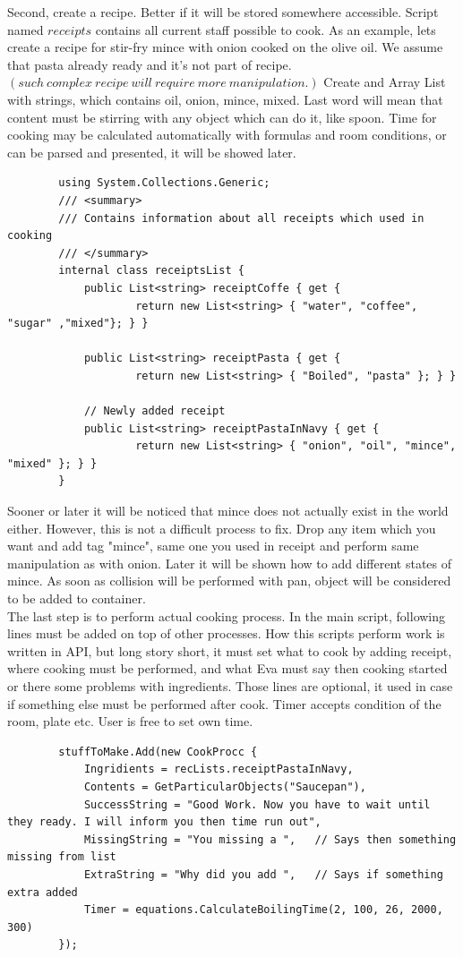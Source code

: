 \documentclass[18pt]{article}
\numberwithin{equation}{section} %
\numberwithin{figure}{section} %
\numberwithin{table}{section} %
\begin{document}
		Second, create a recipe. Better if it will be stored somewhere accessible. Script named $receipts$ contains all current staff possible to cook. As an example, lets create a recipe for stir-fry mince with onion cooked on the olive oil. We assume that pasta already ready and it's not part of recipe. $ \left(such\ complex\ recipe\ will\ require\ more\ manipulation.  \right) $ Create and Array List with strings, which contains oil, onion, mince, mixed. Last word will mean that content must be stirring with any object which can do it, like spoon. Time for cooking may be calculated automatically with formulas and room conditions, or can be parsed and presented, it will be showed later.
		
		\lstset{style=sharpc}
		\begin{lstlisting}
		using System.Collections.Generic;
		/// <summary>
		/// Contains information about all receipts which used in cooking
		/// </summary>
		internal class receiptsList {    
			public List<string> receiptCoffe { get { 
					return new List<string> { "water", "coffee", "sugar" ,"mixed"}; } }
					
			public List<string> receiptPasta { get { 
					return new List<string> { "Boiled", "pasta" }; } }
			
			// Newly added receipt		
			public List<string> receiptPastaInNavy { get { 
					return new List<string> { "onion", "oil", "mince", "mixed" }; } }
		}
		\end{lstlisting}
		
		Sooner or later it will be noticed that mince does not actually exist in the world either. However, this is not a difficult process to fix. Drop any item which you want and add tag "mince", same one you used in receipt and perform same manipulation as with onion. Later it will be shown how to add different states of mince. As soon as collision will be performed with pan, object will be considered to be added to container. \\
		
		The last step is to perform actual cooking process. In the main script, following lines must be added on top of other processes. How this scripts perform work is written in API, but long story short, it must set what to cook by adding receipt, where cooking must be performed, and what Eva must say then cooking started or there some problems with ingredients. Those lines are optional, it used in case if something else must be performed after cook. Timer accepts condition of the room, plate etc. User is free to set own time.		
		\lstset{style=sharpc}
		\begin{lstlisting}
		stuffToMake.Add(new CookProcc {
			Ingridients = recLists.receiptPastaInNavy,
			Contents = GetParticularObjects("Saucepan"),
			SuccessString = "Good Work. Now you have to wait until they ready. I will inform you then time run out",
			MissingString = "You missing a ",	// Says then something missing from list
			ExtraString = "Why did you add ",	// Says if something extra added
			Timer = equations.CalculateBoilingTime(2, 100, 26, 2000, 300)
		});
		\end{lstlisting}
		
\end{document}
